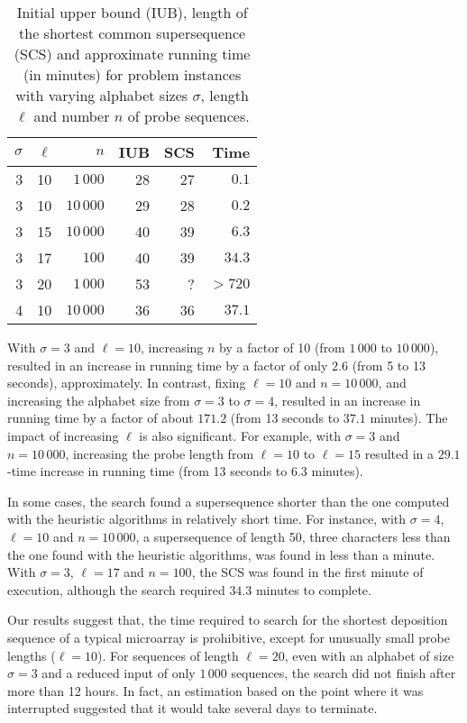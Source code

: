 \begin{table}[t!]\centering
\caption{\label{tab:scs}
  Initial upper bound (IUB), length of the shortest common supersequence (SCS)
  and approximate running time (in minutes) for problem instances with varying
  alphabet sizes $\sigma$, length $\ell$ and number $n$ of probe sequences.}
\footnotesize{
\begin{tabular}{rrrrrr}
$\sigma$ & $\ell$ &       $n$ & IUB & SCS &    Time \\ \hline
       3 &     10 &  $1\,000$ &  28 &  27 &   $0.1$ \\
       3 &     10 & $10\,000$ &  29 &  28 &   $0.2$ \\ 
       3 &     15 & $10\,000$ &  40 &  39 &   $6.3$ \\
       3 &     17 &     $100$ &  40 &  39 &  $34.3$ \\
       3 &     20 &  $1\,000$ &  53 &   ? & $> 720$ \\
       4 &     10 & $10\,000$ &  36 &  36 &  $37.1$ \\ \hline
\end{tabular}}
\end{table}

With $\sigma = 3$ and $\ell = 10$, increasing $n$ by a factor of 10 (from
$1\,000$ to $10\,000$), resulted in an increase in running time by a factor of
only $2.6$ (from 5 to 13 seconds), approximately. In contrast, fixing
$\ell = 10$ and $n = 10\,000$, and increasing the alphabet size from $\sigma = 3$
to $\sigma = 4$, resulted in an increase in running time by a factor of about
$171.2$ (from 13 seconds to $37.1$ minutes). The impact of increasing $\ell$ is
also significant. For example, with $\sigma = 3$ and $n = 10\,000$, increasing
the probe length from $\ell=10$ to $\ell = 15$ resulted in a $29.1$-time
increase in running time (from 13 seconds to $6.3$ minutes).

In some cases, the search found a supersequence shorter than the one computed
with the heuristic algorithms in relatively short time. For instance, with
$\sigma = 4$, $\ell = 10$ and $n=10\,000$, a supersequence of length 50, three
characters less than the one found with the heuristic algorithms, was found in
less than a minute. With $\sigma = 3$, $\ell = 17$ and $n=100$, the SCS was
found in the first minute of execution, although the search required $34.3$
minutes to complete.

Our results suggest that, the time required to search for the shortest
deposition sequence of a typical microarray is prohibitive, except for unusually
small probe lengths ($\ell = 10$). For sequences of length $\ell = 20$, even
with an alphabet of size $\sigma = 3$ and a reduced input of only $1\,000$
sequences, the search did not finish after more than 12 hours. In fact, an
estimation based on the point where it was interrupted suggested that it would
take several days to terminate.

